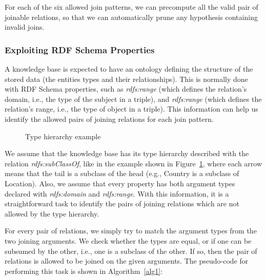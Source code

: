 For each of the six allowed join patterns, we can precompute all the valid pair of joinable relations, so that
we can automatically prune any hypothesis containing invalid joins.

\subsubsection{Exploiting RDF Schema Properties}

A knowledge base is expected to have an ontology defining the structure of the stored data (the entities types and
their relationships). This is normally done with RDF Schema properties, such as \emph{rdfs:range} (which
defines the relation's domain, i.e., the type of the subject in a triple), and \emph{rdfs:range} (which defines the
relation's range, i.e., the type of object in a triple). This information can help us identify the allowed pairs
of joining relations for each join pattern.

\begin{figure}[h!]
  \caption{Type hierarchy example}
  \centering
  \label{fig:hierarchy}
\end{figure}

We assume that the knowledge base has its type hierarchy described with the relation \emph{rdfs:subClassOf}, like in
the example shown in Figure~\ref{fig:hierarchy}, where each arrow means that the tail is a subclass of the head (e.g.,
Country is a subclass of Location). Also, we assume that every property has both argument types declared with
\emph{rdfs:domain} and \emph{rdfs:range}. With this information, it is a straightforward task to identify the pairs of
joining relations which are not allowed by the type hierarchy.    

For every pair of relations, we simply try to match the argument types from the two joining arguments. We
check whether the types are equal, or if one can be subsumed by the other, i.e., one is a subclass of the other. If so,
then the pair of relations is allowed to be joined on the given arguments. The pseudo-code for performing this task is
shown in Algorithm~\ref{alg1}:

